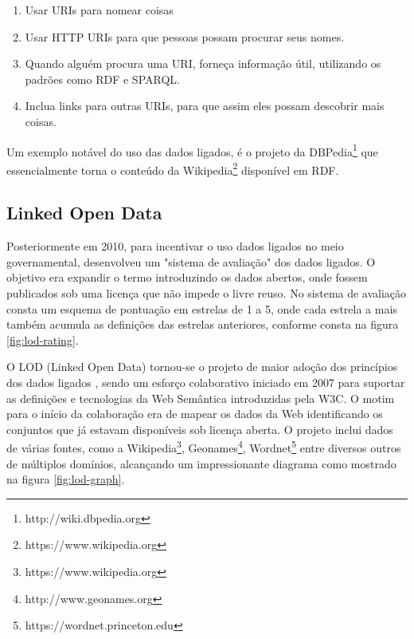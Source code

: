 \begin{enumerate}
	\item{Usar URIs para nomear coisas}
	\item{Usar HTTP URIs para que pessoas possam procurar seus nomes.}
	\item{Quando alguém procura uma URI, forneça informação útil, utilizando os padrões como RDF e SPARQL.}
	\item{Inclua links para outras URIs, para que assim eles possam descobrir mais coisas.}	
\end{enumerate}

Um exemplo notável do uso das dados ligados, é o projeto da DBPedia\footnote{ http://wiki.dbpedia.org} que essencialmente torna o conteúdo da Wikipedia\footnote{https://www.wikipedia.org} disponível em RDF.

\subsection{Linked Open Data}

Posteriormente em 2010, para incentivar o uso dados ligados no meio governamental, \cite{LinkedData:2006} desenvolveu um "sistema de avaliação" dos dados ligados. O objetivo era expandir o termo introduzindo os dados abertos, onde fossem publicados sob uma licença que não impede o livre reuso. No sistema de avaliação consta um esquema de pontuação em estrelas de 1 a 5, onde cada estrela a mais também acumula as definições das estrelas anteriores, conforme consta na figura \ref{fig:lod-rating}.

O LOD (Linked Open Data) tornou-se o projeto de maior adoção dos princípios dos dados ligados \citep{Bizer2009}, sendo um esforço colaborativo iniciado em 2007 para suportar as definições e tecnologias da Web Semântica introduzidas pela W3C. O motim para o início da colaboração era de mapear os dados da Web identificando os conjuntos que já estavam disponíveis sob licença aberta. O projeto inclui dados de várias fontes, como a Wikipedia\footnote{https://www.wikipedia.org}, Geonames\footnote{http://www.geonames.org}, Wordnet\footnote{https://wordnet.princeton.edu} entre diversos outros de múltiplos domínios, alcançando um impressionante diagrama como mostrado na figura \ref{fig:lod-graph}.

